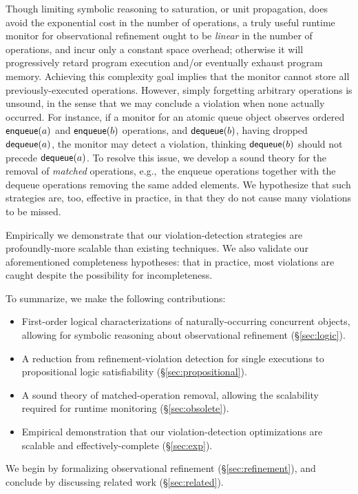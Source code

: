 Though limiting symbolic reasoning to saturation, or unit propagation, does
avoid the exponential cost in the number of operations, a truly useful runtime
monitor for observational refinement ought to be \emph{linear} in the number of
operations, and incur only a constant space overhead; otherwise it will
progressively retard program execution and/or eventually exhaust program
memory. Achieving this complexity goal implies that the monitor cannot store
all previously-executed operations. However, simply forgetting arbitrary
operations is unsound, in the sense that we may conclude a violation when none
actually occurred. For instance, if a monitor for an atomic queue object
observes ordered ${\sf enqueue}(a)$ and ${\sf enqueue}(b)$ operations, and
${\sf dequeue}(b)$, having dropped ${\sf dequeue}(a)$, the monitor may detect a
violation, thinking ${\sf dequeue}(b)$ should not precede ${\sf dequeue}(a)$.
To resolve this issue, we develop a sound theory for the removal of
\emph{matched} operations, e.g.,~the {\sf enqueue} operations together with the
{\sf dequeue} operations removing the same added elements. We hypothesize that
such strategies are, too, effective in practice, in that they do not cause many
violations to be missed.

Empirically we demonstrate that our violation-detection strategies are
profoundly-more scalable than existing techniques. We also validate our
aforementioned completeness hypotheses: that in practice, most violations are
caught despite the possibility for incompleteness.

To summarize, we make the following contributions:
\begin{itemize}

  \item First-order logical characterizations of naturally-occurring concurrent
  objects, allowing for symbolic reasoning about observational refinement
  (\S\ref{sec:logic}).

  \item A reduction from refinement-violation detection for single executions
  to propositional logic satisfiability (\S\ref{sec:propositional}).
  
  \item A sound theory of matched-operation removal, allowing the scalability
  required for runtime monitoring (\S\ref{sec:obsolete}).
  
  \item Empirical demonstration that our violation-detection optimizations are
  scalable and effectively-complete (\S\ref{sec:exp}).

\end{itemize}
We begin by formalizing observational refinement (\S\ref{sec:refinement}), and
conclude by discussing related work (\S\ref{sec:related}).
